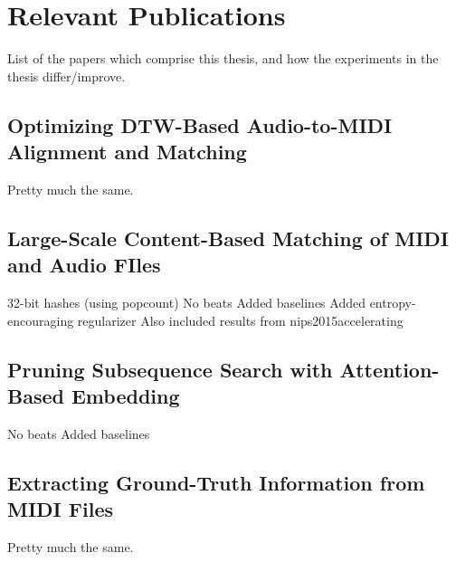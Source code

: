 \chapter{Relevant Publications}

List of the papers which comprise this thesis, and how the experiments in the thesis differ/improve.

\section{Optimizing DTW-Based Audio-to-MIDI Alignment and Matching}

Pretty much the same.

\section{Large-Scale Content-Based Matching of MIDI and Audio FIles}

32-bit hashes (using popcount)
No beats
Added baselines
Added entropy-encouraging regularizer
Also included results from nips2015accelerating

\section{Pruning Subsequence Search with Attention-Based Embedding}

No beats
Added baselines

\section{Extracting Ground-Truth Information from MIDI Files}

Pretty much the same.
